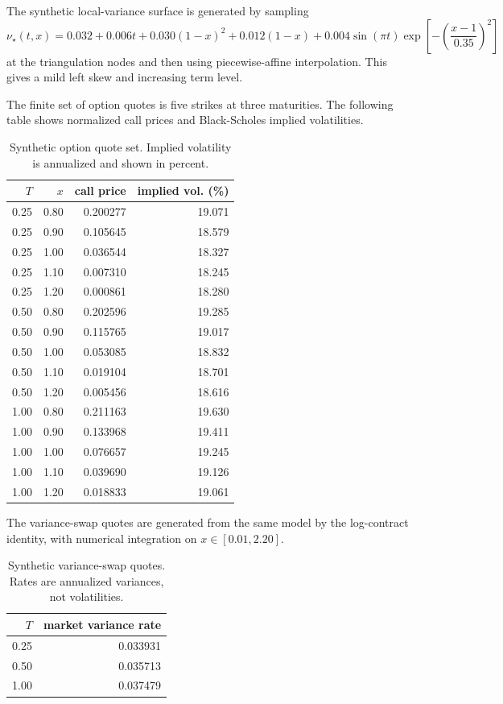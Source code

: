 \documentclass[11pt]{article}
\newcommand{\1}{\mathbf{1}}
\newcommand{\vloc}{\nu}
\begin{document}
The synthetic local-variance surface is generated by sampling
\begin{equation}
  \vloc_\star(t,x)
  =
  0.032+0.006t+0.030(1-x)^2+0.012(1-x)
  +0.004\sin(\pi t)\exp\!\left[-\left(\frac{x-1}{0.35}\right)^2\right]
  \label{eq:example_true_surface}
\end{equation}
at the triangulation nodes and then using piecewise-affine interpolation. This gives a
mild left skew and increasing term level.

The finite set of option quotes is five strikes at three maturities. The following table
shows normalized call prices and Black-Scholes implied volatilities.

\begin{table}[h!]
\centering
\caption{Synthetic option quote set. Implied volatility is annualized and shown in percent.}
\begin{tabular}{rrrr}
\toprule
$T$ & $x$ & call price & implied vol. (\%)\\
\midrule
0.25 & 0.80 & 0.200277 & 19.071\\
0.25 & 0.90 & 0.105645 & 18.579\\
0.25 & 1.00 & 0.036544 & 18.327\\
0.25 & 1.10 & 0.007310 & 18.245\\
0.25 & 1.20 & 0.000861 & 18.280\\
0.50 & 0.80 & 0.202596 & 19.285\\
0.50 & 0.90 & 0.115765 & 19.017\\
0.50 & 1.00 & 0.053085 & 18.832\\
0.50 & 1.10 & 0.019104 & 18.701\\
0.50 & 1.20 & 0.005456 & 18.616\\
1.00 & 0.80 & 0.211163 & 19.630\\
1.00 & 0.90 & 0.133968 & 19.411\\
1.00 & 1.00 & 0.076657 & 19.245\\
1.00 & 1.10 & 0.039690 & 19.126\\
1.00 & 1.20 & 0.018833 & 19.061\\
\bottomrule
\end{tabular}
\label{tab:quote_set}
\end{table}

The variance-swap quotes are generated from the same model by the log-contract identity,
with numerical integration on $x\in[0.01,2.20]$.

\begin{table}[h!]
\centering
\caption{Synthetic variance-swap quotes. Rates are annualized variances, not volatilities.}
\begin{tabular}{rr}
\toprule
$T$ & market variance rate\\
\midrule
0.25 & 0.033931\\
0.50 & 0.035713\\
1.00 & 0.037479\\
\bottomrule
\end{tabular}
\label{tab:var_quotes}
\end{table}
\end{document}
